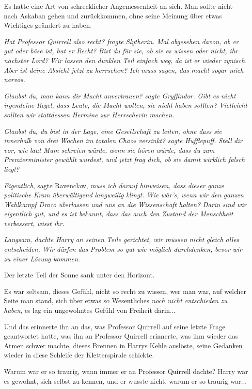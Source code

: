 {Es hatte eine Art von schrecklicher Angemessenheit an sich. Man sollte nicht nach Askaban gehen und zurückkommen, ohne seine Meinung über etwas Wichtiges geändert zu haben.

\emph{\emph{Hat Professor Quirrell also recht}? fragte Slytherin. \emph{Mal abgesehen davon, ob er gut oder böse ist, hat er} Recht\emph{? Bist du für sie, ob sie es wissen oder nicht, ihr nächster Lord? Wir} \emph{lassen den dunklen Teil einfach weg, da ist er wieder zynisch. Aber ist deine Absicht jetzt zu herrschen? Ich muss sagen, das macht sogar} mich \emph{nervös.}}

\emph{\emph{Glaubst du, man kann dir Macht anvertrauen?} sagte Gryffindor. \emph{Gibt es nicht irgendeine Regel, dass Leute, die Macht wollen, sie nicht haben sollten? Vielleicht sollten wir stattdessen Hermine zur Herrscherin machen.}}

\emph{\emph{Glaubst du, du bist in der Lage, eine Gesellschaft zu leiten, ohne dass sie innerhalb von drei Wochen im totalen Chaos versinkt?} sagte Hufflepuff. \emph{Stell dir vor, wie laut Mum schreien würde, wenn sie hören würde, dass du zum Premierminister gewählt wurdest, und jetzt frag dich, ob sie damit wirklich falsch liegt?}}

\emph{Eigentlich}, sagte Ravenclaw, \emph{muss ich darauf hinweisen, dass dieser ganze politische Kram überwältigend langweilig klingt. Wie wär's, wenn wir den ganzen Wahlkampf Draco überlassen und uns an die Wissenschaft halten? Darin sind wir eigentlich gut, und es ist bekannt, dass das auch den Zustand der Menschheit verbessert, wisst ihr.}

\emph{\emph{Langsam}, dachte Harry an seinen Teile gerichtet, \emph{wir müssen nicht gleich alles entscheiden. Wir dürfen das Problem so gut wie möglich durchdenken, bevor wir zu einer Lösung kommen.}}

Der letzte Teil der Sonne sank unter den Horizont.

Es war seltsam, dieses Gefühl, nicht so recht zu wissen, wer man war, auf welcher Seite man stand, sich über etwas so Wesentliches \emph{noch nicht entschieden zu haben}, es lag ein ungewohntes Gefühl von Freiheit darin...

Und das erinnerte ihn an das, was Professor Quirrell auf seine letzte Frage geantwortet hatte, was ihn an Professor Quirrell erinnerte, was ihm wieder das Atmen schwer machte, dieses Brennen in Harrys Kehle auslöste, seine Gedanken wieder in diese Schleife der Kletterspirale schickte.

Warum war er so traurig, wann immer er an Professor Quirrell dachte? Harry war es gewohnt, sich selbst zu kennen, und er wusste nicht, warum er so traurig war...

}
